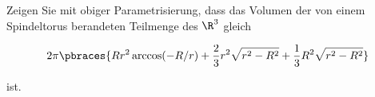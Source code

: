 
\begin{exercise}

Zeigen Sie mit obiger Parametrisierung, dass das Volumen der von einem Spindeltorus berandeten Teilmenge des $\R^3$ gleich

\begin{align*}
    2 \pi
    \pbraces
    {
        R r^2 \arccos(-R / r)
        +
        \frac{2}{3} r^2 \sqrt{r^2 - R^2}
        +
        \frac{1}{3} R^2 \sqrt{r^2 - R^2}
    }
\end{align*}

ist.

\end{exercise}



